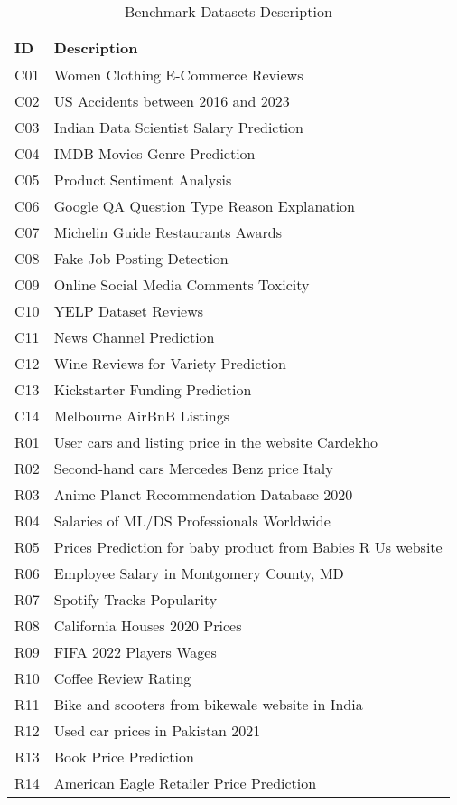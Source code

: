 \begin{table}
\caption{Benchmark Datasets Description}
\label{tab:benchmarks_description}
\begin{tabular}{ll}
\toprule
ID & Description \\
\midrule
C01 & Women Clothing E-Commerce Reviews \\
C02 & US Accidents between 2016 and 2023 \\
C03 & Indian Data Scientist Salary Prediction \\
C04 & IMDB Movies Genre Prediction \\
C05 & Product Sentiment Analysis \\
C06 & Google QA Question Type Reason Explanation \\
C07 & Michelin Guide Restaurants Awards \\
C08 & Fake Job Posting Detection \\
C09 & Online Social Media Comments Toxicity \\
C10 & YELP Dataset Reviews \\
C11 & News Channel Prediction \\
C12 & Wine Reviews for Variety Prediction \\
C13 & Kickstarter Funding Prediction \\
C14 & Melbourne AirBnB Listings \\
R01 & User cars and listing price in the website Cardekho \\
R02 & Second-hand cars Mercedes Benz price Italy \\
R03 & Anime-Planet Recommendation Database 2020 \\
R04 & Salaries of ML/DS Professionals Worldwide \\
R05 & Prices Prediction for baby product from Babies R Us website \\
R06 & Employee Salary in Montgomery County, MD \\
R07 & Spotify Tracks Popularity \\
R08 & California Houses 2020 Prices \\
R09 & FIFA 2022 Players Wages \\
R10 & Coffee Review Rating \\
R11 & Bike and scooters from bikewale website in India \\
R12 & Used car prices in Pakistan 2021 \\
R13 & Book Price Prediction \\
R14 & American Eagle Retailer Price Prediction \\

\end{tabular}
\end{table}
